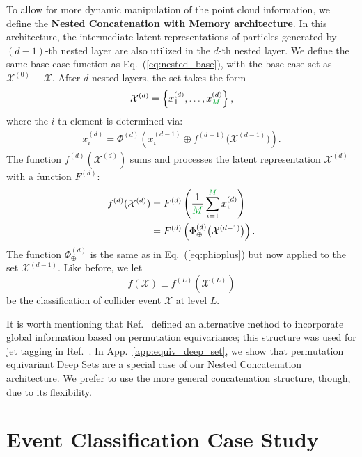 \documentclass[aps,prd,twocolumn,superscriptaddress,floatfix,longbibliography,preprintnumbers,nofootinbib]{revtex4-1} %
\DeclareRobustCommand{\App}[1]{App.~\ref{app:#1}}
\DeclareRobustCommand{\Eq}[1]{Eq.~(\ref{eq:#1})}
\DeclareRobustCommand{\RRef}[1]{Ref.~\cite{#1}}
\begin{document}
To allow for more dynamic manipulation of the point cloud information, we define the \textbf{Nested Concatenation with Memory architecture}.
%
In this architecture, the intermediate latent representations of particles generated by $(d-1)$-th nested layer are also utilized in the $d$-th nested layer.
%
We define the same base case function as \Eq{nested_base}, with the base case set as $\mathcal X^{(0)} \equiv \mathcal X$.
%
After $d$ nested layers, the set takes the form
      \begin{equation}
        \label{eq:gen_nested_xd}
        \mathcal X^{(d)} = \left\{ x_1^{(d)},\dots,x_{{\color{c2}M}}^{(d)} \right\},
      \end{equation}
%
where the $i$-th element is determined via:
% 
      \begin{align}
      \label{eq:concat_for_AppA}
        x^{(d)}_i = \Phi^{(d)}\left( x_i^{(d-1)}\oplus f^{(d-1)}\big(\mathcal X^{(d-1)}\big) \right).
      \end{align}
%
   The function $f^{(d)}(\mathcal X^{(d)})$ sums and processes the latent representation $\mathcal X^{(d)}$ with a function \(F^{(d)}\):
      \begin{align}
        \nonumber
        f^{(d)}(\mathcal X^{(d)}) &= F^{(d)} \left( \frac{1}{{\color{c2}M}}\sum_{i=1}^{{\color{c2}M}}x_i^{(d)} \right) \\
                                  &= F^{(d)} \left( \Phi_{\oplus}^{(d)}\big( \mathcal X^{(d-1)} \big)  \right) .
        \label{eq:gen_nested}
      \end{align}
%
The function $\Phi_{\oplus}^{(d)}$ is the same as in \Eq{phioplus} but now applied to the set $\mathcal X^{(d-1)}$.
%
Like before, we let
      \begin{equation}
         f(\mathcal X) \equiv f^{(L)}(\mathcal X^{(L)})
      \end{equation}
      be the classification of collider event $\mathcal X$ at level $L$. 


It is worth mentioning that \RRef{Zaheer2017} defined an alternative method to incorporate global information based on permutation equivariance; this structure was used for jet tagging in \RRef{Dolan:2020qkr}.
%
In \App{equiv_deep_set}, we show that permutation equivariant Deep Sets are a special case of our Nested Concatenation architecture.
%
We prefer to use the more general concatenation structure, though, due to its flexibility.


\section{Event Classification Case Study}
\label{sec:exp}
\end{document}
